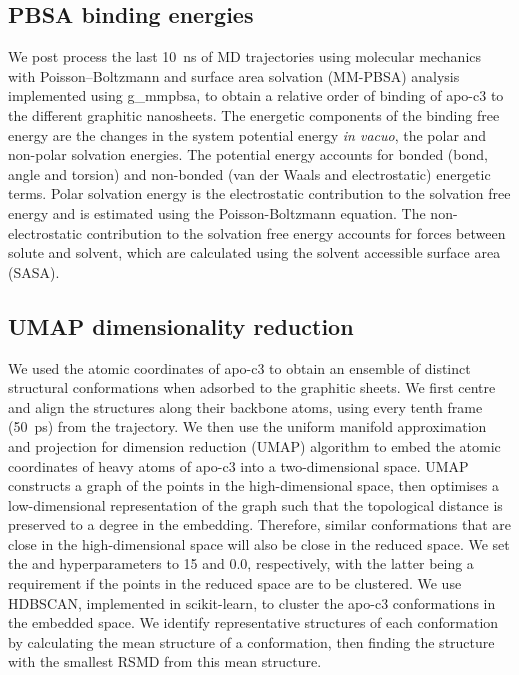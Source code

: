 \subsection{PBSA binding energies}
We post process the last \SI{10}{\nano\second} of MD trajectories using molecular mechanics with Poisson–Boltzmann and surface area solvation (MM-PBSA) analysis implemented using g\_mmpbsa,\cite{kumari2014g_mmpbsa} to obtain a relative order of binding of apo-c3 to the different graphitic nanosheets. The energetic components of the binding free energy are the changes in the system potential energy \textit{in vacuo}, the polar and non-polar solvation energies. The potential energy accounts for bonded (bond, angle and torsion) and non-bonded (van der Waals and electrostatic) energetic terms. Polar solvation energy is the electrostatic contribution to the solvation free energy and is estimated using the Poisson-Boltzmann equation. The non-electrostatic contribution to the solvation free energy accounts for forces between solute and solvent, which are calculated using the solvent accessible surface area (SASA).\cite{kumari2014g_mmpbsa} 
%
\subsection{UMAP dimensionality reduction}
We used the atomic coordinates of apo-c3 to obtain an ensemble of distinct structural conformations when adsorbed to the graphitic sheets. We first centre and align the structures along their backbone atoms, using every tenth frame (\SI{50}{\pico\second}) from the trajectory. We then use the uniform manifold approximation and projection for dimension reduction (UMAP\cite{mcinnes2018umap-software}) algorithm to embed the atomic coordinates of heavy atoms of apo-c3 into a two-dimensional space. UMAP constructs a graph of the points in the high-dimensional space, then optimises a low-dimensional representation of the graph such that the topological distance is preserved to a degree in the embedding.\cite{mcinnes2018umap-software} Therefore, similar conformations that are close in the high-dimensional space will also be close in the reduced space. We set the  and  hyperparameters to 15 and 0.0, respectively, with the latter being a requirement if the points in the reduced space are to be clustered. We use HDBSCAN\cite{mcinnes2017hdbscan}, implemented in scikit-learn\cite{scikit-learn}, to cluster the apo-c3 conformations in the embedded space. We identify representative structures of each conformation by calculating the mean structure of a conformation, then finding the structure with the smallest RSMD from this mean structure.
%
